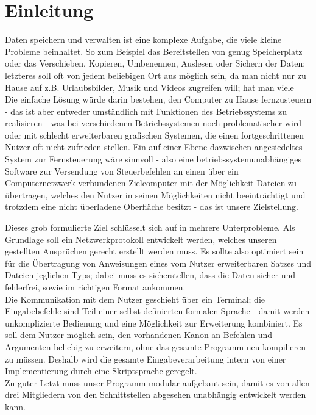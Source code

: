 \documentclass[12pt,a4paper]{scrartcl}
\begin{document}
\section*{Einleitung}
Daten speichern und verwalten ist eine komplexe Aufgabe, die viele kleine Probleme beinhaltet. So zum Beispiel das Bereitstellen von genug Speicherplatz oder das Verschieben, Kopieren, Umbenennen, Auslesen oder Sichern der Daten; letzteres soll oft von jedem beliebigen Ort aus möglich sein, da man nicht nur zu Hause auf z.B. Urlaubsbilder, Musik und Videos zugreifen will; hat man viele\\
Die einfache Lösung würde darin bestehen, den Computer zu Hause fernzusteuern - das ist aber entweder umständlich mit Funktionen des Betriebssystems zu realisieren - was bei verschiedenen Betriebssystemen noch problematischer wird - oder mit schlecht erweiterbaren grafischen Systemen, die einen fortgeschrittenen Nutzer oft nicht zufrieden stellen.
Ein auf einer Ebene dazwischen angesiedeltes System zur Fernsteuerung wäre sinnvoll - also eine betriebssystemunabhängiges Software zur Versendung von Steuerbefehlen an einen über ein Computernetzwerk verbundenen Zielcomputer mit der Möglichkeit Dateien zu übertragen, welches den Nutzer in seinen Möglichkeiten nicht beeinträchtigt und trotzdem eine nicht überladene Oberfläche besitzt - das ist unsere Zielstellung.

Dieses grob formulierte Ziel schlüsselt sich auf in mehrere Unterprobleme. Als Grundlage soll ein Netzwerkprotokoll entwickelt werden, welches unseren gestellten Ansprüchen gerecht erstellt werden muss. Es sollte also optimiert sein für die Übertragung von Anweisungen eines vom Nutzer erweiterbaren Satzes und Dateien jeglichen Typs; dabei muss es sicherstellen, dass die Daten sicher und fehlerfrei, sowie im richtigen Format ankommen.\\
Die Kommunikation mit dem Nutzer geschieht über ein Terminal; die Eingabebefehle sind Teil einer selbst definierten formalen Sprache - damit werden unkomplizierte Bedienung und eine Möglichkeit zur Erweiterung kombiniert.
Es soll dem Nutzer möglich sein, den vorhandenen Kanon an Befehlen und Argumenten beliebig zu erweitern, ohne das gesamte Programm neu kompilieren zu müssen. Deshalb wird die gesamte Eingabeverarbeitung intern von einer Implementierung durch eine Skriptsprache geregelt.\\
Zu guter Letzt muss unser Programm modular aufgebaut sein, damit es von allen drei Mitgliedern von den Schnittstellen abgesehen unabhängig entwickelt werden kann.
\end{document}
